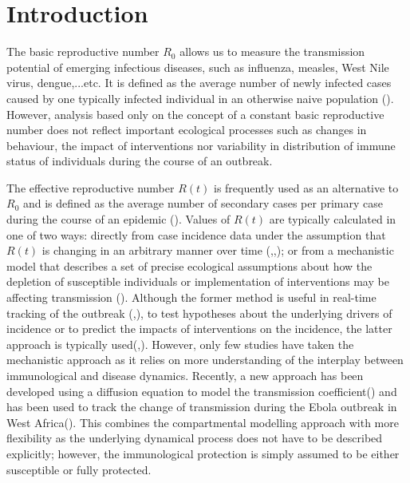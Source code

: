 \documentclass{article}
\begin{document}
\section{Introduction}
The basic reproductive number $R_{0}$ allows us to measure the transmission potential of emerging infectious diseases, such as influenza, measles, West Nile virus, dengue,...etc. It is defined as the average number of newly infected cases caused by one typically infected individual in an otherwise naive population (\cite{Heesterbeek2002}). However, analysis based only on the concept of a constant basic reproductive number does not reflect important ecological processes such as changes in behaviour, the impact of interventions nor variability in distribution of immune status of individuals during the course of an outbreak.

The effective reproductive number $R(t)$ is frequently used as an alternative to $R_{0}$ and is defined as the average number of secondary cases per primary case during the course of an epidemic (\cite{Anderson1991}). Values of $R(t)$ are typically calculated in one of two ways: directly from case incidence data under the assumption that $R(t)$ is changing in an arbitrary manner over time (\cite{Wallinga2004},\cite{Wallinga2007},\cite{Grassly2008}); or from a mechanistic model that describes a set of precise ecological assumptions about how the depletion of susceptible individuals or implementation of interventions may be affecting transmission (\cite{Anderson1991}). Although the former method is useful in real-time tracking of the outbreak (\cite{Whoebola2014},\cite{Fraser2009}), to test hypotheses about the underlying drivers of incidence or to predict the impacts of interventions on the incidence, the latter approach is typically used(\cite{Dorigatti2013},\cite{Baguelin2013}). However, only few studies have taken the mechanistic approach as it relies on more understanding of the interplay between immunological and disease dynamics. Recently, a new approach has been developed using a diffusion equation to model the transmission coefficient(\cite{Dureau2013}) and has been used to track the change of transmission during the Ebola outbreak in West Africa(\cite{Camacho2015}). This combines the compartmental modelling approach with more flexibility as the underlying dynamical  process does not have to be described explicitly; however, the immunological protection is simply assumed to be either susceptible or fully protected. 
\end{document}
